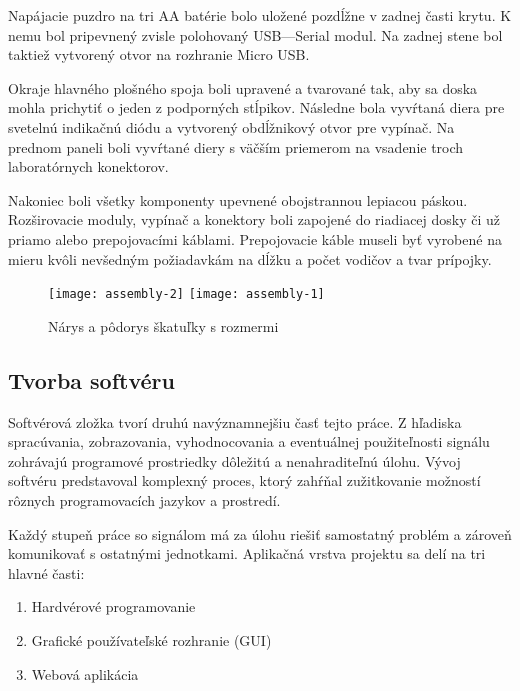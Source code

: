 \documentclass[titlepage,12pt]{article}
\begin{document}
Napájacie puzdro na tri AA batérie bolo uložené pozdĺžne v zadnej časti krytu. K nemu bol pripevnený zvisle polohovaný USB—Serial modul. Na zadnej stene bol taktiež vytvorený otvor na rozhranie Micro USB.

Okraje hlavného plošného spoja boli upravené a tvarované tak, aby sa doska mohla prichytiť o jeden z podporných stĺpikov. Následne bola vyvŕtaná diera pre svetelnú indikačnú diódu \linebreak a vytvorený obdĺžnikový otvor pre vypínač. Na prednom paneli boli vyvŕtané diery s väčším priemerom na vsadenie troch laboratórnych konektorov.

Nakoniec boli všetky komponenty upevnené obojstrannou lepiacou páskou. Rozširovacie moduly, vypínač a konektory boli zapojené do riadiacej dosky či už priamo alebo prepojovacími káblami. Prepojovacie káble museli byť vyrobené na mieru kvôli nevšedným požiadavkám na dĺžku a počet vodičov a tvar prípojky.


\begin{figure}[!ht]
\begin{center}
\texttt{[image: assembly-2]}
\texttt{[image: assembly-1]}
\caption{Nárys a pôdorys škatuľky s rozmermi}
\end{center}
\end{figure}

\newpage
\subsection{Tvorba softvéru}
Softvérová zložka tvorí druhú navýznamnejšiu časť tejto práce. Z hľadiska spracúvania, zobrazovania, vyhodnocovania a eventuálnej použiteľnosti signálu zohrávajú programové prostriedky dôležitú a nenahraditeľnú úlohu. Vývoj softvéru predstavoval komplexný proces, ktorý zahŕňal zužitkovanie možností rôznych programovacích jazykov a prostredí.

Každý stupeň práce so signálom má za úlohu riešiť samostatný problém a zároveň komunikovať s ostatnými jednotkami. Aplikačná vrstva projektu sa delí na tri hlavné časti:
\begin{enumerate}
	\item Hardvérové programovanie
	\item Grafické používateľské rozhranie (GUI)
	\item Webová aplikácia
\end{enumerate}
\end{document}
